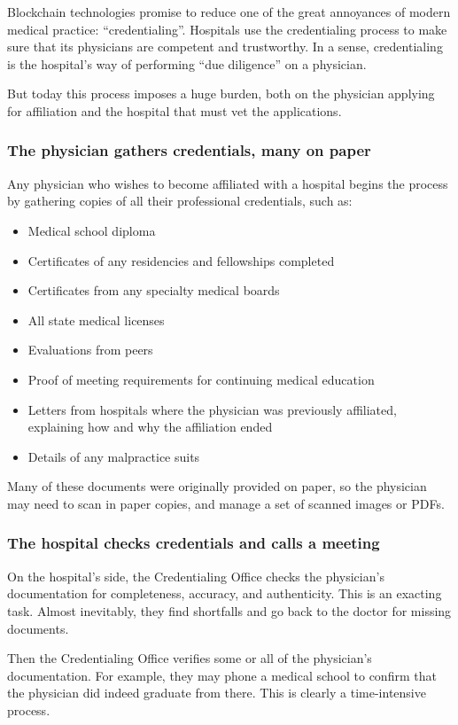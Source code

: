 Blockchain technologies promise to reduce one of the great annoyances of modern medical practice: ``credentialing''. Hospitals use the credentialing process to make sure that its physicians are competent and trustworthy. In a sense, credentialing is the hospital's way of performing ``due diligence'' on a physician. 

But today this process imposes a huge burden, both on the physician applying for affiliation and the hospital that must vet the applications.

\subsubsection{The physician gathers credentials, many on paper}
Any physician who wishes to become affiliated with a hospital begins the process by gathering
copies of all their professional credentials, such as:

\begin{itemize}
\item Medical school diploma
\item Certificates of any residencies and fellowships completed
\item Certificates from any specialty medical boards 
\item All state medical licenses 
\item Evaluations from peers
\item Proof of meeting requirements for continuing medical education 
\item Letters from hospitals where the physician was previously affiliated, explaining how and why  the affiliation ended 
\item Details of any malpractice suits 
\end{itemize}

Many of these documents were originally provided on paper, so the physician may need to scan in  paper copies, and manage a set of scanned images or PDFs. 

\subsubsection{The hospital checks credentials and calls a meeting}
On the hospital's side, the Credentialing Office checks the physician's documentation for completeness, accuracy, and authenticity. 
This is an exacting task. 
Almost inevitably, they find shortfalls and go back to the doctor for missing documents. 

Then the Credentialing Office verifies some or all of the physician's documentation. 
For example, they may phone a medical school to confirm that the physician did indeed graduate from there. 
This is clearly a time-intensive process.

